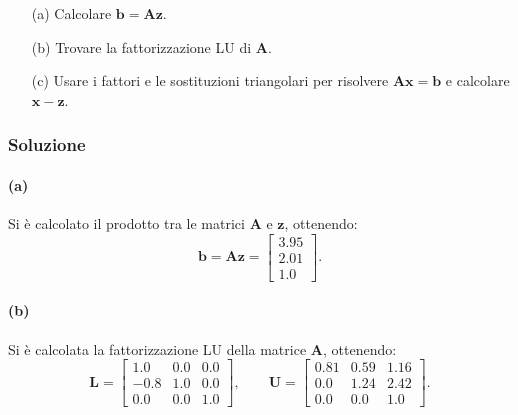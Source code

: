 \documentclass[letterpaper, 12pt]{article}
\numberwithin{equation}{section}    %
\begin{document}
\begin{enumerate}
        \item[(a)] Calcolare $\mathbf{b} = \mathbf{A}\mathbf{z}$.
        \item[(b)] Trovare la fattorizzazione LU di $\mathbf{A}$.
        \item[(c)] Usare i fattori e le sostituzioni triangolari per risolvere $\mathbf{A}\mathbf{x} = \mathbf{b}$ 
                   e calcolare $\mathbf{x} - \mathbf{z}$.
\end{enumerate}

\subsubsection{Soluzione}
\paragraph{(a)}Si è calcolato il prodotto tra le matrici $\mathbf{A}$ e $\mathbf{z}$, ottenendo:
\begin{equation*}
    \mathbf{b} = \mathbf{A}\mathbf{z} = \begin{bmatrix}
        3.95 \\
        2.01 \\
        1.0
    \end{bmatrix}. 
\end{equation*}
\paragraph{(b)}Si è calcolata la fattorizzazione LU della matrice $\mathbf{A}$, ottenendo:
\begin{equation*}
    \mathbf{L} = \begin{bmatrix}
        1.0  &     0.0  & 0.0 \\
        -0.8  &  1.0  & 0.0 \\
        0.0  &  0.0  &  1.0
    \end{bmatrix}, \qquad
    \mathbf{U} = \begin{bmatrix}
        0.81  &  0.59  &  1.16 \\
        0.0       &  1.24   &  2.42 \\
        0.0       &  0.0       &  1.0
    \end{bmatrix}.
\end{equation*}
\end{document}

